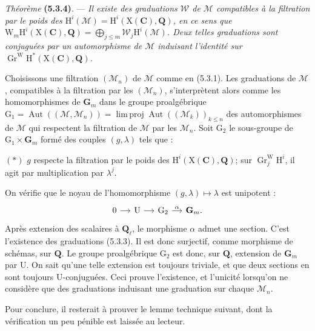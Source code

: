 \documentclass[11pt,leqno]{article}
\begin{document}
\textit{Théorème} \textbf{(5.3.4)}. — \textit{Il existe des graduations
\(\mathscr{W}\) de \(\mathscr{M}\) compatibles à la filtration par le poids
des \(\mathrm{H}^i(\mathscr{M})=\mathrm{H}^i(\mathrm{X}(\mathbf{C}),\mathbf{Q})\),
en ce sens que
\(\mathrm{W}_m\mathrm{H}^i(\mathrm{X}(\mathbf{C}),\mathbf{Q})
=\bigoplus\limits_{j\leq m}\mathscr{W}_j\mathrm{H}^i(\mathscr{M})\).
Deux telles graduations sont conjuguées par un automorphisme de
\(\mathscr{M}\) induisant l’identité sur
\(\operatorname{Gr}^{\mathrm{W}}\mathrm{H}^*(\mathrm{X}(\mathbf{C}),\mathbf{Q})\).}

Choisissons une filtration \((\mathscr{M}_n)\) de \(\mathscr{M}\) comme en
(5.3.1). Les graduations de \(\mathscr{M}\), compatibles à la filtration
par les \((\mathscr{M}_n)\), s’interprètent alors comme les homomorphismes
de \(\mathbf{G}_m\) dans le groupe proalgébrique
\(\mathrm{G}_1=\operatorname{Aut}((\mathscr{M},\mathscr{M}_n))
=\operatorname{lim\,proj}\operatorname{Aut}((\mathscr{M}_k))_{k\leq n}\)
des automorphismes de \(\mathscr{M}\) qui respectent la filtration de
\(\mathscr{M}\) par les \(\mathscr{M}_n\). Soit \(\mathrm{G}_2\) le
sous-groupe de \(\mathrm{G}_1\times\mathbf{G}_m\) formé des couples
\((g,\lambda)\) tels que :

\((*)\) \(g\) respecte la filtration par le poids des
\(\mathrm{H}^i(\mathrm{X}(\mathbf{C}),\mathbf{Q})\); sur
\(\operatorname{Gr}^{\mathrm{W}}_j\mathrm{H}^i\), il agit par
multiplication par \(\lambda^j\).

On vérifie que le noyau de l’homomorphisme
\((g,\lambda)\mapsto\lambda\) est unipotent :
\[
\begin{tikzcd}[column sep=small]
0 \arrow[r] &
\mathrm{U} \arrow[r] &
\mathrm{G}_2 \arrow[r,"\alpha"] &
\mathbf{G}_m .
\end{tikzcd}
\]
Après extension des scalaires à \(\mathbf{Q}_\ell\), le morphisme
\(\alpha\) admet une section. C’est l’existence des graduations (5.3.3).
Il est donc surjectif, comme morphisme de schémas, sur \(\mathbf{Q}\).
Le groupe proalgébrique \(\mathrm{G}_2\) est donc, sur \(\mathbf{Q}\),
extension de \(\mathbf{G}_m\) par \(\mathrm{U}\). On sait qu’une telle
extension est toujours triviale, et que deux sections en sont toujours
\(\mathrm{U}\)-conjuguées. Ceci prouve l’existence, et l’unicité lorsqu’on
ne considère que des graduations induisant une graduation sur chaque
\(\mathscr{M}_n\).

Pour conclure, il resterait à prouver le lemme technique suivant, dont
la vérification un peu pénible est laissée au lecteur.
\end{document}
